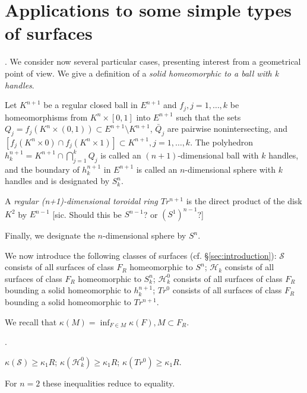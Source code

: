\documentclass{amsart}
\theoremstyle{plain}
\theoremstyle{definition}
\begin{document}
\section{Applications to some simple types of surfaces}\label{sec:applications}

. We consider now several particular cases, presenting interest
from a geometrical point of view. We give a definition of a
{\em solid homeomorphic to a ball with k handles}.

Let $K^{n+1}$ be a regular closed ball in $E^{n+1}$ and $f_j,
j=1,\ldots, k$ be homeomorphisms from $K^n \times [0,1]$
into $E^{n+1}$ such that the sets $Q_j = f_j(K^n\times (0,1))
\subset E^{n+1} \setminus K^{n+1}$, $\bar Q_j$ are pairwise
nonintersecting, and $[f_j(K^n \times 0) \cap f_j(K^n \times 1)]
\subset K^{n+1}, j=1,\ldots, k$. The polyhedron $h^{n+1}_k =
K^{n+1} \cap \bigcap^k_{j=1} Q_j$ is called an
$(n+1)$-dimensional ball with $k$ handles, and the boundary of
$h^{n+1}_k$ in $E^{n+1}$ is called an $n$-dimensional sphere
with $k$ handles and is designated by $S^n_k$.

A {\em regular (n+1)-dimensional toroidal ring $Tr^{n+1}$} is
the direct product of the disk $K^2$ by $E^{n-1}$ [sic. Should 
this be $S^{n-1}$? or $(S^1)^{n-1}$?]

Finally, we designate the $n$-dimensional sphere by $S^n$.

We now introduce the following classes of surfaces (cf. \S \ref{sec:introduction}): $\mathcal{S}$ consists of all surfaces of class $F_R$
homeomorphic to $S^n$; $\mathcal{H}_k$ consists of all surfaces of
class $F_R$ homeomorphic to $S^n_k$; $\mathcal{H}^0_k$ consists
of all surfaces of class $F_R$ bounding a solid homeomorphic 
to $h^{n+1}_k$; $Tr^0$ consists of all surfaces of class $F_R$
bounding a solid homeomorphic to $Tr^{n+1}$.

We recall that $\kappa(M) = \inf_{F \in M} \kappa(F), M\subset F_R$.

.
\begin{thm} [= Theorem \ref{Theorem 4}] $\kappa(\mathcal{S}) \ge \kappa_1R$;
$\kappa(\mathcal{H}^0_k) \ge \kappa_1R$; $\kappa(Tr^0) \ge \kappa_1R$.

For $n=2$ these inequalities reduce to equality.
\end{thm}
\end{document}
